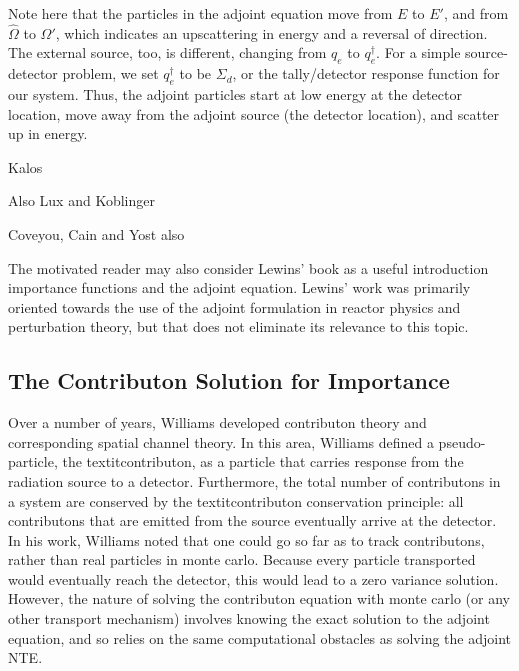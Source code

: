 Note here that the particles in the adjoint equation move from $E$ to $E'$, and from $\hat\Omega$ to $\hat\Omega'$, which indicates an upscattering in energy and a reversal of direction. The external source, too, is different, changing from $q_{e}$ to $q_{e}^\dagger$. For a simple source-detector problem, we set $q_{e}^\dagger$ to be $\Sigma _{ d }$, or the tally/detector response function for our system. Thus, the adjoint particles start at low energy at the detector location, move away from the adjoint source (the detector location), and scatter up in energy. 

Kalos \cite{kalos_importance_1963, goertzel_monte_1958}

Also Lux and Koblinger \cite{lux_monte_carlo}

Coveyou, Cain and Yost \cite{coveyou_adjoint_1967} also 


The motivated reader may also consider Lewins' book \cite{lewins_importance:_1965} as a
useful introduction importance functions and the adjoint equation. Lewins' work was
primarily oriented towards the use of the adjoint formulation in reactor physics and
 perturbation theory, but that does not eliminate its relevance to this topic. 



\subsection{The Contributon Solution for Importance}
\label{sec:ContributonImportance}

Over a number of years, Williams \cite{williams_generalized_1991,williams_contributorn_1992,williams_contributon_study} developed contributon theory and corresponding spatial channel theory. In this area, Williams defined a pseudo-particle, the textit{contributon}, as a particle that carries response from the radiation source to a detector. Furthermore, the total number of contributons in a system are conserved by the textit{contributon conservation principle}: all contributons that are emitted from the source eventually arrive at the detector.  In his work, Williams noted that one could go so far as to track contributons, rather than real particles in monte carlo. Because every particle transported would eventually reach the detector, this would lead to a zero variance solution. However, the nature of solving the contributon equation with monte carlo (or any other transport mechanism) involves knowing the exact solution to the adjoint equation, and so relies on the same computational obstacles as solving the adjoint NTE. 

